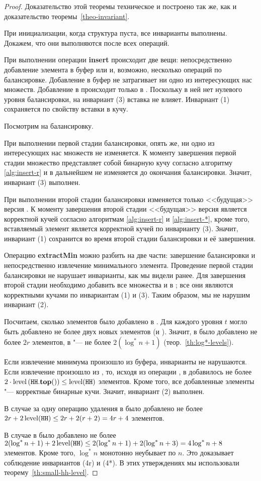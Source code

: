 \begin{proof}
Доказательство этой теоремы техническое и построено так же, как и
доказательство теоремы~\ref{theo-invariant}.

При инициализации, когда структура пуста, все инварианты выполнены. Докажем,
что они выполняются после всех операций.

При выполнении операции \textbf{insert} происходит две вещи: непосредственно добавление
элемента в буфер или \MH[1] и, возможно, несколько операций по балансировке. Добавление
в буфер не затрагивает ни одно из интересующих нас множеств. Добавление в \MH[1]
происходит только в \CH[*]. Поскольку в ней нет нулевого уровня балансировки,
на инвариант (3) вставка не влияет. Инвариант (1) сохраняется по свойству вставки в кучу.

Посмотрим на балансировку.

При выполнении первой стадии балансировки, опять же, ни одно из интересующих
нас множеств не изменяется. К моменту завершения первой стадии множество
 представляет собой бинарную кучу согласно алгоритму \ref{alg:insert-r}
и в дальнейшем не изменяется до окончания балансировки. Значит, инвариант
(3) выполнен.

При выполнении второй стадии балансировки изменяется только <<будущая>>
версия \MH. К моменту завершения второй стадии <<будущая>> версия является
корректной кучей согласно алгоритмам \ref{alg:insert-r} и \ref{alg:insert-*},
кроме того, вставляемый элемент является корректной кучей по инварианту (3). Значит,
инвариант (1) сохранится во время второй стадии балансировки и её завершения.

Операцию \textbf{extractMin} можно разбить на две части: завершение балансировки
и непосредственно извлечение минимального элемента. Проведение первой стадии
балансировки не нарушает инварианты, как мы видели ранее. Для завершения
второй стадии необходимо добавить все множества  и \MH[t] в \HH; все они
являются корректными кучами по инвариантам (1) и (3). Таким образом, мы не нарушим
инвариант (2).

Посчитаем, сколько элементов было добавлено в \HH. Для каждого уровня $t$ могло
быть добавлено не более двух новых элементов (\MH[t] и ).
Значит, в \CH[r] было добавлено не более $2r$ элементов, в \CH[*] "---
не более $2(\log^* n+1)$ (теор.~\ref{th:log*-levels}).

Если извлечение минимума произошло из буфера, инварианты не нарушаются. Если
извлечение произошло из \HH, то, исходя из операции \Yield, в \HH
добавилось не более $2 \cdot \operatorname{level} \left(\texttt{HH}.\mathbf{top}()\right) \leq \operatorname{level}(\texttt{HH})$ элементов. Кроме того,
все добавленные элементы "--- корректные бинарные кучи. Значит, инвариант (2)
выполнен.

В случае \CH[r] за одну операцию удаления в \HH было добавлено не более
$2r + 2\operatorname{level}(\texttt{HH}) \leq 2r + 2(r+2) = 4r+4$ элементов.

В случае \CH[*] в \HH было добавлено не более
$2(\log^*n + 1) + 2\operatorname{level}(\texttt{HH}) \leq 2(\log^*n+1) + 2(\log^*n+3)
= 4 \log^*n + 8$ элементов. Кроме того, $\log^*n$ монотонно неубывает
по $n$. Это доказывает соблюдение инвариантов (4r) и (4*).
В этих утверждениях мы использовали теорему~\ref{th:small-hh-level}.
\end{proof}


